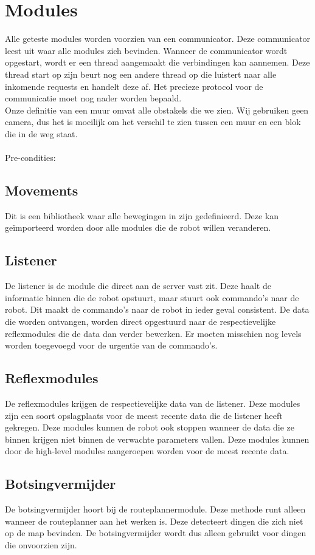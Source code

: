 \documentclass[a4paper,10pt]{article}
\begin{document}
\section{Modules}
\label{sec:modules}
Alle geteste modules worden voorzien van een communicator. Deze communicator leest uit waar alle modules zich bevinden. Wanneer de communicator wordt opgestart, wordt er een thread aangemaakt die verbindingen kan aannemen. Deze thread start op zijn beurt nog een andere thread op die luistert naar alle inkomende requests en handelt deze af. Het precieze protocol voor de communicatie moet nog nader worden bepaald. \\
Onze definitie van een muur omvat alle obstakels die we zien. Wij gebruiken geen camera, dus het is moeilijk om het verschil te zien tussen een muur en een blok die in de weg staat.\\
\\Pre-condities:
\subsection{Movements}
Dit is een bibliotheek waar alle bewegingen in zijn gedefinieerd. Deze kan ge\"{i}mporteerd worden door alle modules die de robot willen veranderen.
\subsection{Listener}
De listener is de module die direct aan de server vast zit. Deze haalt de informatie binnen die de robot opstuurt, maar stuurt ook commando's naar de robot. Dit maakt de commando's naar de robot in ieder geval consistent. De data die worden ontvangen, worden direct opgestuurd naar de respectievelijke reflexmodules die de data dan verder bewerken. Er moeten misschien nog levels worden toegevoegd voor de urgentie van de commando's.
\subsection{Reflexmodules}
De reflexmodules krijgen de respectievelijke data van de listener. Deze modules zijn een soort opslagplaats voor de meest recente data die de listener heeft gekregen. Deze modules kunnen de robot ook stoppen wanneer de data die ze binnen krijgen niet binnen de verwachte parameters vallen. Deze modules kunnen door de high-level modules aangeroepen worden voor de meest recente data.
\subsection{Botsingvermijder}
De botsingvermijder hoort bij de routeplannermodule. Deze methode runt alleen wanneer de routeplanner aan het werken is. Deze detecteert dingen die zich niet op de map bevinden. De botsingvermijder wordt dus alleen gebruikt voor dingen die onvoorzien zijn.
\end{document}
